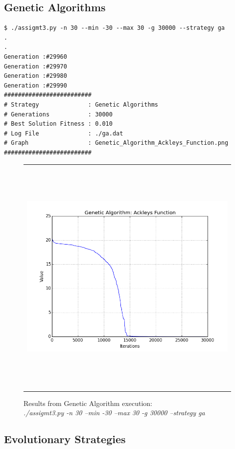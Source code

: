 \documentclass[]{spie}  %
\begin{document}
\subsection{Genetic Algorithms}
\begin{verbatim}
$ ./assigmt3.py -n 30 --min -30 --max 30 -g 30000 --strategy ga
.
.
Generation :#29960
Generation :#29970
Generation :#29980
Generation :#29990
#########################
# Strategy              : Genetic Algorithms
# Generations           : 30000
# Best Solution Fitness : 0.010
# Log File              : ./ga.dat
# Graph                 : Genetic_Algorithm_Ackleys_Function.png
#########################
\end{verbatim}
\begin{figure} [ht]
\begin{center}
\begin{tabular}{c} 
\includegraphics[height=12cm]{Genetic_Algorithm_Ackleys_Function.png}
\end{tabular}
\end{center}
\caption[ga_results] 
{ \label{fig:image-ga} 
Results from Genetic Algorithm execution: \\
\textit{./assigmt3.py -n 30 --min -30 --max 30 -g 30000 --strategy ga}}
\end{figure} 

\subsection{Evolutionary Strategies}
\end{document}
